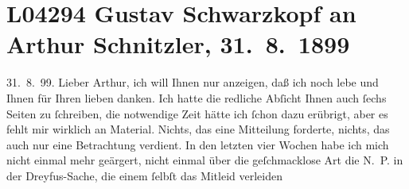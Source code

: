 

\section[Gustav Schwarzkopf an Arthur Schnitzler, 31. 8. 1899]{L04294 Gustav Schwarzkopf an Arthur Schnitzler, 31. 8. 1899}
\nopagebreak{}
\rehead{ }\normalsize\beginnumbering{}
\toendnotes[C]{\smallbreak\pagebreak[2]}
\toendnotes[C]{\smallbreak}
\toendnotes[C]{\smallbreak}
\pstart
           \raggedleft{}{\pb}31. 8. 99.\pend
           \vspace{0.5em}
\pstart
           Lieber Arthur, ich will Ihnen nur anzeigen, daß ich noch lebe und
               Ihnen für Ihren lieben \label{K_L04294-1v}\label{K_L04294-1} danken. Ich hatte die
               redliche Abſicht Ihnen auch{ }ſechs Seiten zu{ }ſchreiben, die notwendige Zeit hätte ich{ }ſchon dazu erübrigt, aber es fehlt mir wirklich an Material. Nichts, das eine
               Mitteilung forderte, nichts, das auch nur eine Betrachtung verdient. In den letzten
               vier Wochen habe ich mich nicht einmal mehr geärgert, nicht einmal über die
               geſchmacklose Art die N. P. in der Dreyfus-Sache, {\pb}die einem{ }ſelbſt das Mitleid verleiden
